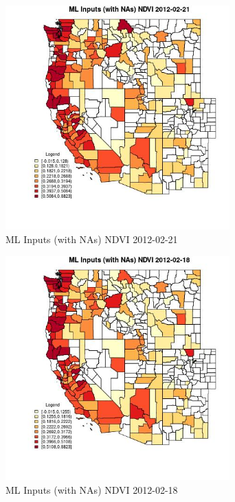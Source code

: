 \begin{figure} 
\centering  
\includegraphics[width=0.77\textwidth]{Code_Outputs/Report_ML_input_PM25_Step4_part_f_de_duplicated_aveswNAs_CountyNDVIMean2012-02-21.jpg} 
\caption{\label{fig:Report_ML_input_PM25_Step4_part_f_de_duplicated_aveswNAsCountyNDVIMean2012-02-21}ML Inputs (with NAs) NDVI 2012-02-21} 
\end{figure} 
 

\clearpage 

\begin{figure} 
\centering  
\includegraphics[width=0.77\textwidth]{Code_Outputs/Report_ML_input_PM25_Step4_part_f_de_duplicated_aveswNAs_CountyNDVIMean2012-02-18.jpg} 
\caption{\label{fig:Report_ML_input_PM25_Step4_part_f_de_duplicated_aveswNAsCountyNDVIMean2012-02-18}ML Inputs (with NAs) NDVI 2012-02-18} 
\end{figure} 
 

